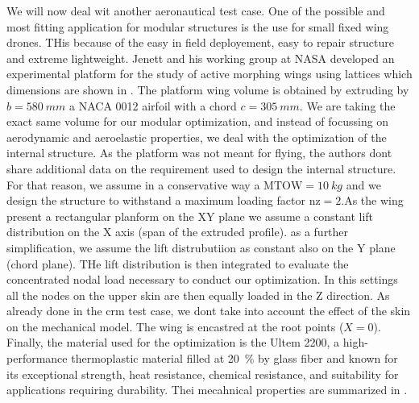 We will now deal wit another aeronautical test case. One of the possible and most fitting application for modular structures is the use for small fixed wing drones. THis because of the easy in field deployement, easy to repair structure and extreme lightweight. Jenett and his working group at NASA developed an experimental platform for the study of active morphing wings using lattices which dimensions are shown in . The platform wing volume is obtained by extruding by $b=\qty{580}{mm}$ a NACA 0012 airfoil with a chord $c=\qty{305}{mm}$. We are taking the exact same volume for our modular optimization, and instead of focussing on aerodynamic and aeroelastic properties, we deal with the optimization of the internal structure. As the platform was not meant for flying, the authors dont share additional data on the requirement used to design the internal structure. For that reason, we assume in a conservative way a $\text{MTOW}=\qty{10}{kg}$ and we design the structure to withstand a maximum loading factor $\text{nz}=2$.As the wing present a rectangular planform on the XY plane we assume a constant lift distribution on the X axis (span of the extruded profile). as a further simplification, we assume the lift distrubutiion as constant also on the Y plane (chord plane). THe lift distribution is then integrated to evaluate the concentrated nodal load necessary to conduct our optimization. In this settings all the nodes on the upper skin are then equally loaded in the Z direction. As already done in the \gls{crm} test case, we dont take into account the effect of the skin on the mechanical model. The wing is encastred at the root points ($X=0$). Finally, the material used for the optimization is the Ultem 2200, a high-performance thermoplastic material filled at \qty{20}{\percent} by glass fiber and known for its exceptional strength, heat resistance, chemical resistance, and suitability for applications requiring durability. Thei mecahnical properties are summarized in .

